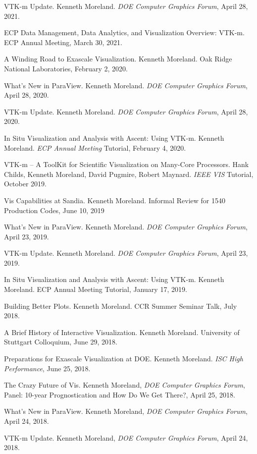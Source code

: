 \documentclass{article}
\begin{document}
\begin{enumerate}[label={[\arabic*]}]
\item VTK-m Update.
  Kenneth Moreland.
  \emph{DOE Computer Graphics Forum}, April 28, 2021.
\item ECP Data Management, Data Analytics, and Visualization Overview: VTK-m.
  ECP Annual Meeting, March 30, 2021.
\item A Winding Road to Exascale Visualization.
  Kenneth Moreland.
  Oak Ridge National Laboratories, February 2, 2020.
\item What's New in ParaView.
  Kenneth Moreland.
  \emph{DOE Computer Graphics Forum}, April 28, 2020.
\item VTK-m Update.
  Kenneth Moreland.
  \emph{DOE Computer Graphics Forum}, April 28, 2020.
\item In Situ Visualization and Analysis with Ascent: Using VTK-m.
  Kenneth Moreland.
  \emph{ECP Annual Meeting} Tutorial, February 4, 2020.
\item VTK-m -- A ToolKit for Scientific Visualization on Many-Core Processors.
  Hank Childs, Kenneth Moreland, David Pugmire, Robert Maynard.
  \emph{IEEE VIS} Tutorial, October 2019.
\item Vis Capabilities at Sandia.
  Kenneth Moreland.
  Informal Review for 1540 Production Codes, June 10, 2019
\item What's New in ParaView.
  Kenneth Moreland.
  \emph{DOE Computer Graphics Forum}, April 23, 2019.
\item VTK-m Update.
  Kenneth Moreland.
  \emph{DOE Computer Graphics Forum}, April 23, 2019.
\item In Situ Visualization and Analysis with Ascent: Using VTK-m.
  Kenneth Moreland.
  ECP Annual Meeting Tutorial, January 17, 2019.
\item Building Better Plots.
  Kenneth Moreland.
  CCR Summer Seminar Talk, July 2018.
\item A Brief History of Interactive Visualization.
  Kenneth Moreland.
  University of Stuttgart Colloquium, June 29, 2018.
\item Preparations for Exascale Visualization at DOE.
  Kenneth Moreland.
  \emph{ISC High Performance}, June 25, 2018.
\item The Crazy Future of Vis.
  Kenneth Moreland, \emph{DOE Computer Graphics Forum}, Panel: 10-year Prognostication and How Do We Get There?, April 25, 2018.
\item What's New in ParaView.
  Kenneth Moreland, \emph{DOE Computer Graphics Forum}, April 24, 2018.
\item VTK-m Update.
  Kenneth Moreland, \emph{DOE Computer Graphics Forum}, April 24, 2018.

\end{enumerate}
\end{document}
